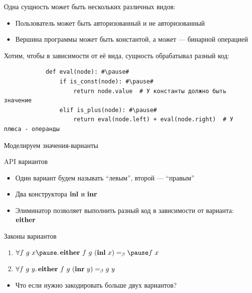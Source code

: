    \begin{frame}[fragile]{\subsecname}
        Одна сущность может быть нескольких различных видов:
        \begin{itemize}
            \item \pause Пользователь может быть авторизованный и не авторизованный
            \item \pause Вершина программы может быть константой, а может --- бинарной операцией
        \end{itemize}
        \pause
        \vspace{1em}
        Хотим, чтобы в зависимости от её вида, сущность обрабатывал разный код:
        \begin{verbatim}
            def eval(node): #\pause#
                if is_const(node): #\pause#
                    return node.value  # У константы должно быть значение
                elif is_plus(node): #\pause#
                    return eval(node.left) + eval(node.right)  # У плюса - операнды
        \end{verbatim}
    \end{frame}

    \begin{frame}[fragile]{Моделируем значения-варианты}
        \pause
        \begin{block}{API вариантов}
            \begin{itemize}
                \item Один вариант будем называть ``левым'', второй --- ``правым''
                \item Два конструктора $\mathbf{inl}$ и $\mathbf{inr}$
                \item Элиминатор позволяет выполнить разный код в зависимости от варианта: $\mathbf{either}$
            \end{itemize}
        \end{block}
        \pause
        \begin{block}{Законы вариантов}
            \begin{enumerate}
                \item $\forall f~g~x \pause \ldotp \term{either} \ap f \ap g \ap (\term{inl} \ap x) \eqbeta \pause f \ap x$
                \item $\forall f~g~y \ldotp \mathbf{either} ~ f ~ g ~ (\mathbf{inr} ~ y) =_\beta g ~ y$
            \end{enumerate}
        \end{block}
        \pause
        \begin{itemize}
            \item[\todo] Что если нужно закодировать больше двух вариантов?
        \end{itemize}
    \end{frame}

